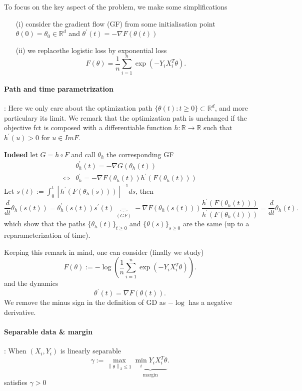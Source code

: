 To focus on the key aspect of the problem, we make some simplifications \begin{enumerate}
    \item [(i)] consider the gradient flow (GF) from some initialisation point $ \theta (0) = \theta _0 \in \mathbb{R}^d $ and $ \theta ^\prime (t) = - \nabla F(\theta (t)) $ 
    \item [(ii)] we replacethe logistic loss by exponential loss 
    \[
        F(\theta ) = \frac{1 }{n } \sum_{i=1}^{n } \exp (-Y_i X_i^T \theta )
    .\]
\end{enumerate}
\paragraph{Path and time parametrization}: Here we only care about the optimization path $ \{\theta (t) : t \geq 0\} \subset \mathbb{R}^d $, and more particulary its limit. We remark that the optimization path is unchanged if the objective fct is composed with a differentiable function $ h: \mathbb{R} \to \mathbb{R} $ such that $ h^\prime (u) > 0  $ for $ u \in Im F $.

\textbf{Indeed} let $ G = h \circ F $ and call $ \theta _h $ the corresponding GF 
\begin{align*}
    & \theta ^\prime _h (t) = - \nabla G(\theta _h (t))\\
    \Leftrightarrow & \theta ^\prime _h = - \nabla F(\theta _h (t)) h^\prime (F(\theta _h (t))) 
\end{align*}
Let $ s(t) := \int_{0}^{t} [h^\prime (F(\theta _h (s)))]^{-1}ds $, then 
\[
    \frac{d}{dt}\theta _h(s(t)) = \theta _h^\prime (s(t)) s^\prime (t) \underbrace{=}_{(GF)} - \nabla F(\theta_h (s(t))) \frac{h^\prime  (F(\theta _h(t )))}{h^\prime (F (\theta _h (t)))} = \frac{d}{dt}  \theta _h(t) 
.\]
which show that the paths $ \{\theta _h (t) \}_{t \geq 0} $ and $ \{\theta (s)\}_{s \geq 0} $  are the same (up to a reparameterization of time).

Keeping this remark in mind, one can consider (finally we study)
\[
    F(\theta ) := - \log (\frac{1 }{n } \sum_{i=1 }^{n } \exp (-Y_i X_i^T \theta )) 
.\]
and the dynamics 
\[
    \theta ^\prime (t) = \nabla F(\theta (t))
.\]
We remove the minus sign in the definition of GD as $ -\log $ has a negative derivative.

\paragraph{Separable data \& margin}: When $ (X_i, Y_i) $ is linearly separable 
\[
    \gamma := \max _{\left\| \theta  \right\| _2 \leq 1} \underbrace{\min _i Y_i X_i ^T \theta}_{\text{margin}}  
.\]
satisfies $ \gamma > 0 $ 

